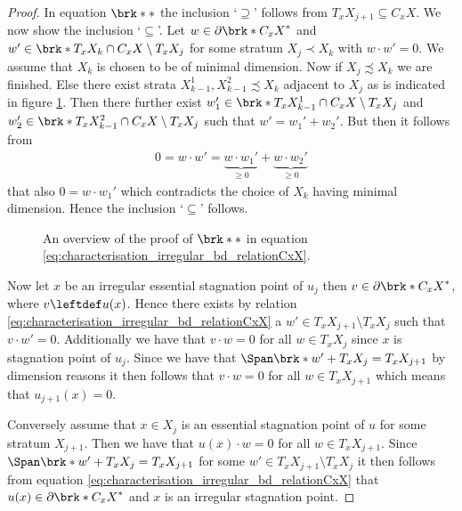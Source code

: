 \begin{proof}
  In equation $\brk*{*}$ 
  the inclusion `$\supseteq$' follows from $T_xX_{j+1}\subseteq C_xX$.
  We now show the
  inclusion `$\subseteq$'. Let $w\in \partial\brk*{C_xX}^*$ and $w'\in \brk*{T_xX_k\cap C_xX}\setminus T_xX_j$ for some stratum $X_j\prec X_k$ with $w\cdot w'=0$.
  We assume that $X_k$ is chosen to be of minimal dimension.
  Now if $X_j\precsim X_k$ we are finished. Else there exist strata $X_{k-1}^1,X_{k-1}^2\precsim X_k$
  adjacent to $X_j$ as is indicated in figure \ref{fi:irregularCPs_X123}. Then there further exist $w_1'\in \brk*{T_xX_{k-1}^1\cap C_xX}\setminus T_xX_j$ and $w_2'\in \brk*{T_xX_{k-1}^2\cap C_xX}\setminus T_xX_j$
  such that $w'=w_1'+w_2'$. But then it follows from
  \begin{align*}
    0=w\cdot w'=\underbrace{w\cdot w_1'}_{\geq0}+\underbrace{w\cdot w_2'}_{\geq0}
  \end{align*}
  that also $0=w\cdot w_1'$ which contradicts the choice of $X_k$ having minimal dimension.
  Hence the inclusion `$\subseteq$' follows.
  \begin{figure}
    \centering
    
    \caption{An overview of the proof of $\brk*{*}$ in equation \eqref{eq:characterisation_irregular_bd_relationCxX}.}
    \label{fi:irregularCPs_X123}
  \end{figure}

  Now let $x$ be an irregular essential stagnation point of $u_j$ then  $v\in \partial\brk*{C_xX}^*$, where $v\leftdef u(x)$. Hence there
  exists by relation \eqref{eq:characterisation_irregular_bd_relationCxX} a $w'\in T_xX_{j+1}\setminus T_xX_j$ such that $v\cdot w'=0$. 
  Additionally we have that $v\cdot w=0$ for all $w\in T_xX_j$ since $x$ is stagnation point of $u_j$.
  Since we have that
  $\Span\brk*{w'}+T_xX_j=T_xX_{j+1}$ by dimension reasons it then follows that
  $v\cdot w=0$ for all $w\in T_xX_{j+1}$ which means that $u_{j+1}(x)=0$.

  Conversely assume that $x\in X_j$ is an essential stagnation point of $u$ for some stratum $X_{j+1}$. Then we have that
  $u(x)\cdot w=0$ for all $w\in T_xX_{j+1}$. Since  $\Span\brk*{w'}+T_xX_j=T_xX_{j+1}$
  for some $w'\in T_xX_{j+1}\setminus T_xX_j$
  it then follows from equation \eqref{eq:characterisation_irregular_bd_relationCxX} that $u(x)\in \partial\brk*{C_xX}^*$
  and $x$ is an irregular stagnation point.
\end{proof}
